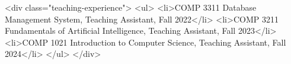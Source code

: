 <div class="teaching-experience">
    <ul>
        <li>COMP 3311 Database Management System, Teaching Assistant, Fall 2022</li>
        <li>COMP 3211 Fundamentals of Artificial Intelligence, Teaching Assistant, Fall 2023</li>
        <li>COMP 1021 Introduction to Computer Science, Teaching Assistant, Fall 2024</li>
    </ul>
</div>